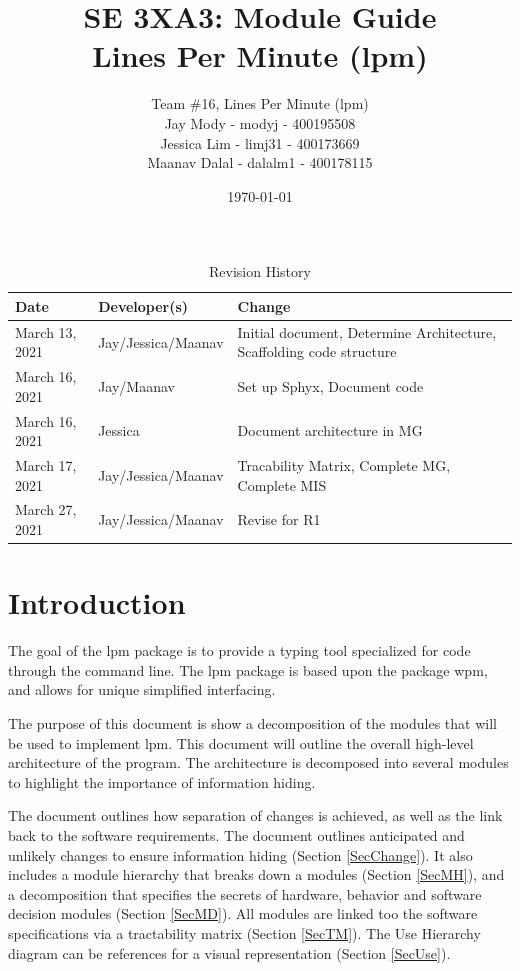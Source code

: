 \documentclass[12pt, titlepage]{article}
\title{\textbf{SE 3XA3: Module Guide}\\Lines Per Minute (lpm)}
\author{Team \#16, Lines Per Minute (lpm)\\
Jay Mody - modyj - 400195508\\
Jessica Lim - limj31 - 400173669\\
Maanav Dalal - dalalm1 - 400178115\\
}
\date{\today}
\begin{document}
\maketitle
\begin{table}[hp]
\caption{Revision History} \label{TblRevisionHistory}
\begin{tabularx}{\textwidth}{llX}
\toprule
\textbf{Date} & \textbf{Developer(s)} & \textbf{Change}\\
\midrule
March 13, 2021 & Jay/Jessica/Maanav & Initial document, Determine Architecture, Scaffolding code structure \\
\midrule
March 16, 2021 & Jay/Maanav & Set up Sphyx, Document code \\
\midrule
March 16, 2021 & Jessica & Document architecture in MG \\
\midrule
March 17, 2021 & Jay/Jessica/Maanav & Tracability Matrix, Complete MG, Complete MIS \\
\midrule
March 27, 2021 & Jay/Jessica/Maanav & Revise for R1 \\
\bottomrule
\end{tabularx}
\end{table}

\newpage

\tableofcontents
\listoftables
\listoffigures



\newpage


\section{Introduction}

The goal of the lpm package is to provide a typing tool specialized for code through the command line. The lpm package is based upon the package wpm, and allows for unique simplified interfacing.

The purpose of this document is show a decomposition of the modules that will be used to implement lpm. This document will outline the overall high-level architecture of the program. The architecture is decomposed into several modules to highlight the importance of information hiding.

The document outlines how separation of changes is achieved, as well as the link back to the software requirements. The document outlines anticipated and unlikely changes to ensure information hiding (Section \ref{SecChange}). It also includes a module hierarchy that breaks down a modules (Section \ref{SecMH}), and a decomposition that specifies the secrets of hardware, behavior and software decision modules (Section \ref{SecMD}). All modules are linked too the software specifications via a tractability matrix (Section \ref{SecTM}). The Use Hierarchy diagram can be references for a visual representation (Section \ref{SecUse}).
\end{document}

